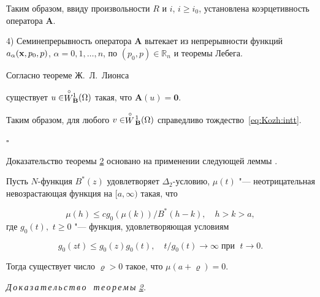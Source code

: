 Таким образом, ввиду произвольности $R$ и $i$, $i\geq i_0$, установлена коэрцетивность оператора $\mathbf{A}$.



\smallskip



4) Семинепрерывность оператора $\mathbf{A}$ вытекает из непрерывности функций $a_{\alpha}({\bf x},p_0,p)$, $\alpha=0, 1,\ldots,n$, по $(p_0,p)\in \mathbb{R}_n$ и теоремы Лебега.



 Согласно  теореме Ж.~Л.~Лионса \cite[гл. II, \S~2, теорема 2.1]{KozhKhad:bib:Lions}

существует $u\in \stackrel {\circ}{W}\!\!_{\bf B}^{1}(\Omega)$ такая, что $\mathbf{A}(u)=\mathbf{0}$.

Таким образом, для любого $v\in\stackrel {\circ}{W}\!_{\bf B}^{1}(\Omega)$ справедливо тождество~\eqref{eq:Kozh:intt}.

$\square$





\smallskip








Доказательство теоремы \hyperlink{kozh:th2}{2} основано на применении следующей леммы \cite{KozhKhad:bib:Korolev2}.



\smallskip



\hypertarget{kozh:lemma4}{}

\begin{lemma}[4]Пусть $N$-функция $B^*(z)$ удовлетворяет $\Delta_2$-условию,  $\mu(t)$ "--- неотрицательная невозрастающая функция на $[a,\infty)$ такая{\rm ,} что

$$\mu(h)\leq cg_0(\mu(k))/B^*(h-k), \quad h>k>a,$$ где $g_0(t),$ $t\geq 0 $ "--- функция{\rm ,} удовлетворяющая условиям

$$g_0(zt)\leq g_0(z)g_0(t),\quad t/g_0(t) \to \infty \;\mbox {при }\; t \to  0.$$

Тогда существует число $\varrho>0$ такое{\rm ,} что $\mu(a+\varrho)=0.$

\end{lemma}



\smallskip



{\it Д\,о\,к\,а\,з\,а\,т\,е\,л\,ь\,с\,т\,в\,о \ т\,е\,о\,р\,е\,м\,ы \rm \hyperlink{kozh:th2}{2}.}

